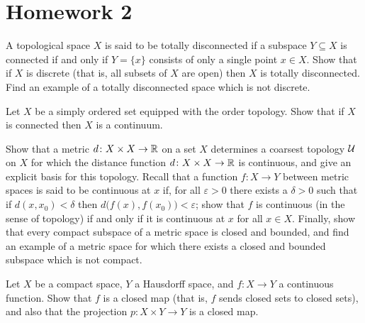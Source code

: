\section{Homework 2}
\begin{exercise}
  A topological space \(X\) is said to be totally disconnected if a
  subspace \(Y\subseteq X\) is connected if and only if \(Y=\{x\}\)
  consists of only a single point \(x\in X\). Show that if \(X\) is
  discrete (that is, all subsets of \(X\) are open) then \(X\) is totally
  disconnected. Find an example of a totally disconnected space which is
  not discrete.
\end{exercise}
\begin{solution}
\end{solution}

\begin{exercise}
  Let \(X\) be a simply ordered set equipped with the order topology. Show
  that if \(X\) is connected then \(X\) is a continuum.
\end{exercise}
\begin{solution}
\end{solution}

\begin{exercise}
  Show that a metric \(d\colon X\times X\to\mathbb{R}\) on a set \(X\) determines
  a coarsest topology \(\mathcal{U}\) on \(X\) for which the distance function
  \(d\colon X\times X\to\mathbb{R}\) is continuous, and give an explicit basis
  for this topology. Recall that a function \(f\colon X\to Y\) between
  metric spaces is said to be continuous at \(x\) if, for all
  \(\varepsilon>0\) there exists a \(\delta>0\) such that if
  \(d(x,x_0)<\delta\) then \(d\bigl(f(x),f(x_0)\bigr)<\varepsilon\); show
  that \(f\) is continuous (in the sense of topology) if and only if it is
  continuous at \(x\) for all \(x\in X\). Finally, show that every compact
  subspace of a metric space is closed and bounded, and find an example of
  a metric space for which there exists a closed and bounded subspace which
  is not compact.
\end{exercise}
\begin{solution}
\end{solution}

\begin{exercise}
  Let \(X\) be a compact space, \(Y\) a Hausdorff space, and
  \(f\colon X\to Y\) a continuous function. Show that \(f\) is a closed map
  (that is, \(f\) sends closed sets to closed sets), and also that the
  projection \(p\colon X\times Y\to Y\) is a closed map.
\end{exercise}
\begin{solution}
\end{solution}

